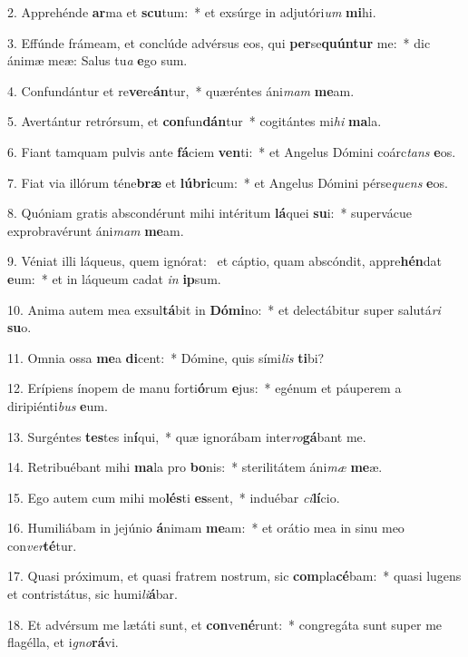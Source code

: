 2. Apprehénde \textbf{ar}ma et \textbf{scu}tum:~*  et exsúrge in adjutóri\textit{um} \textbf{mi}hi.\

3. Effúnde frámeam, et conclúde advérsus eos, qui \textbf{per}se\textbf{quún}\textbf{tur} me:~*  dic ánimæ meæ: Salus tu\textit{a} \textbf{e}go sum.\

4. Confundántur et re\textbf{ve}re\textbf{án}tur,~*  quæréntes áni\textit{mam} \textbf{me}am.\

5. Avertántur retrórsum, et \textbf{con}fun\textbf{dán}tur~*  cogitántes mi\textit{hi} \textbf{ma}la.\

6. Fiant tamquam pulvis ante \textbf{fá}ciem \textbf{ven}ti:~*  et Angelus Dómini coárc\textit{tans} \textbf{e}os.\

7. Fiat via illórum téne\textbf{bræ} et \textbf{lú}\textbf{bri}cum:~*  et Angelus Dómini pérse\textit{quens} \textbf{e}os.\

8. Quóniam gratis abscondérunt mihi intéritum \textbf{lá}quei \textbf{su}i:~*  supervácue exprobravérunt áni\textit{mam} \textbf{me}am.\

9. Véniat illi láqueus, quem ignórat: \dag\  et cáptio, quam abscóndit, appre\textbf{hén}dat \textbf{e}um:~*  et in láqueum cadat \textit{in} \textbf{ip}sum.\

10. Anima autem mea exsul\textbf{tá}bit in \textbf{Dó}\textbf{mi}no:~*  et delectábitur super salutá\textit{ri} \textbf{su}o.\

11. Omnia ossa \textbf{me}a \textbf{di}cent:~*  Dómine, quis sími\textit{lis} \textbf{ti}bi?\

12. Erípiens ínopem de manu forti\textbf{ó}rum \textbf{e}jus:~*  egénum et páuperem a diripiénti\textit{bus} \textbf{e}um.\

13. Surgéntes \textbf{tes}tes in\textbf{í}qui,~*  quæ ignorábam inter\textit{ro}\textbf{gá}bant me.\

14. Retribuébant mihi \textbf{ma}la pro \textbf{bo}nis:~*  sterilitátem áni\textit{mæ} \textbf{me}æ.\

15. Ego autem cum mihi mo\textbf{lés}ti \textbf{es}sent,~*  induébar \textit{ci}\textbf{lí}cio.\

16. Humiliábam in jejúnio \textbf{á}nimam \textbf{me}am:~*  et orátio mea in sinu meo con\textit{ver}\textbf{té}tur.\

17. Quasi próximum, et quasi fratrem nostrum, sic \textbf{com}pla\textbf{cé}bam:~*  quasi lugens et contristátus, sic humi\textit{li}\textbf{á}bar.\

18. Et advérsum me lætáti sunt, et \textbf{con}ve\textbf{né}runt:~*  congregáta sunt super me flagélla, et i\textit{gno}\textbf{rá}vi.\

